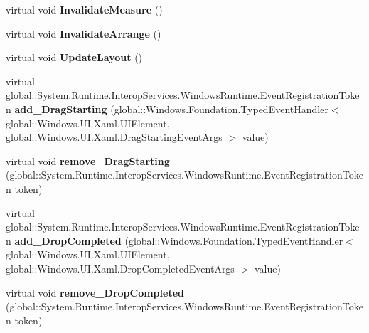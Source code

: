 \begin{DoxyCompactItemize}
virtual void {\bfseries Invalidate\+Measure} ()
\item 
\mbox{\label{class_windows_1_1_u_i_1_1_xaml_1_1_u_i_element_a7d39da17eef05f2abf010551fe537ef7}} 
virtual void {\bfseries Invalidate\+Arrange} ()
\item 
\mbox{\label{class_windows_1_1_u_i_1_1_xaml_1_1_u_i_element_a6b5438d6f477c2ec1851d0ab5cc2d36c}} 
virtual void {\bfseries Update\+Layout} ()
\item 
\mbox{\label{class_windows_1_1_u_i_1_1_xaml_1_1_u_i_element_aef35e032bc4020dd68c6b12a4b83d69c}} 
virtual global\+::\+System.\+Runtime.\+Interop\+Services.\+Windows\+Runtime.\+Event\+Registration\+Token {\bfseries add\+\_\+\+Drag\+Starting} (global\+::\+Windows.\+Foundation.\+Typed\+Event\+Handler$<$ global\+::\+Windows.\+U\+I.\+Xaml.\+U\+I\+Element, global\+::\+Windows.\+U\+I.\+Xaml.\+Drag\+Starting\+Event\+Args $>$ value)
\item 
\mbox{\label{class_windows_1_1_u_i_1_1_xaml_1_1_u_i_element_ae2df4eabbc6b1dbc7a5a85a0866f4fba}} 
virtual void {\bfseries remove\+\_\+\+Drag\+Starting} (global\+::\+System.\+Runtime.\+Interop\+Services.\+Windows\+Runtime.\+Event\+Registration\+Token token)
\item 
\mbox{\label{class_windows_1_1_u_i_1_1_xaml_1_1_u_i_element_a55d6a19a803c9584cc9a54e02eb240aa}} 
virtual global\+::\+System.\+Runtime.\+Interop\+Services.\+Windows\+Runtime.\+Event\+Registration\+Token {\bfseries add\+\_\+\+Drop\+Completed} (global\+::\+Windows.\+Foundation.\+Typed\+Event\+Handler$<$ global\+::\+Windows.\+U\+I.\+Xaml.\+U\+I\+Element, global\+::\+Windows.\+U\+I.\+Xaml.\+Drop\+Completed\+Event\+Args $>$ value)
\item 
\mbox{\label{class_windows_1_1_u_i_1_1_xaml_1_1_u_i_element_a175ef186f4de5c6a422a88d8f42588e3}} 
virtual void {\bfseries remove\+\_\+\+Drop\+Completed} (global\+::\+System.\+Runtime.\+Interop\+Services.\+Windows\+Runtime.\+Event\+Registration\+Token token)
\item 
\mbox{\label{class_windows_1_1_u_i_1_1_xaml_1_1_u_i_element_af82e90640323c9da8621013a558c87f1}} 

\end{DoxyCompactItemize}
